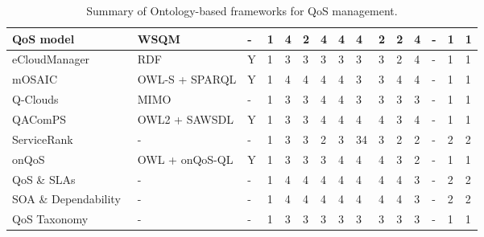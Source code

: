 \begin{sidewaystable}[!ht]
\begin{center}
\begin{tabular}[c]{|p{2.5cm}|p{1.2cm}|p{1.2cm}|p{1.2cm}|p{0.8cm}|p{0.8cm}|p{0.8cm}|p{0.8cm}|p{1.1cm}|p{1.1cm}|p{1.1cm}|p{1.1cm}|p{1.1cm}|p{1.1cm}|p{1.1cm}|}
   QoS model~\cite{Mabrouk:2009:SEQ:1564601.1564724} & WSQM & - &1 &4 &2 &4 &4 &4 &2 &2 &4 &- &1 &1 \\ \hline
   eCloudManager~\cite{Haase:2010:STE:1940334.1940342} & RDF & Y & 1& 3 &3 &3 &3 &3 &3 &2 &4 &- &1 &1 \\ \hline
   mOSAIC~\cite{Cretella:2012:UMS:2428736.2428805} & OWL-S + SPARQL & Y & 1 & 4 &4 &4 &4 &3 &3 &4 &4 &- &1 &1 \\ \hline
   Q-Clouds~\cite{Nathuji:2010:QMP:1755913.1755938} & MIMO & - & 1 & 3 &3 &4 &4 &3 &3 &3 &3 &- &1 &1 \\ \hline
   QAComPS~\cite{dewqacomps} & OWL2 + SAWSDL & Y & 1 & 3 &3 &4 &4 &4 &4 &3 &4 &- &1 &1 \\ \hline
   ServiceRank~\cite{Wu:2009:CQS:1696051.1696105} & - & - & 1 & 3 &3 &2 &3 &34 &3 &2 &2 &- &2 &2 \\ \hline
   onQoS~\cite{Damiano:2009:OQL:1506129.1506143} & OWL + onQoS-QL & Y & 1 & 3 &3 &3 &4 &4 &4 &3 &2 &- &1 &1 \\ \hline
   QoS \& SLAs~\cite{stantchev2009negotiating} & - & - & 1 & 4 & 4 &4 &4 &4 &4 &4 &3 &- &2 &2 \\ \hline
   SOA \& Dependability~\cite{stantchev2011addressing} & - & - & 1 & 4 & 4 &4 &4 &4 &4 &4 &3 &- &2 &2 \\ \hline   
   QoS Taxonomy~\cite{qos-taxonomy} & - & - & 1 & 3 & 3 &3 &3 &3 &3 &3 &3 &- &1 &1 \\ \hline   
\hline
\end{tabular}
\caption{Summary of Ontology-based frameworks for QoS management.}\label{summary-features-qos-models}
  \end{center}
\end{sidewaystable} 

